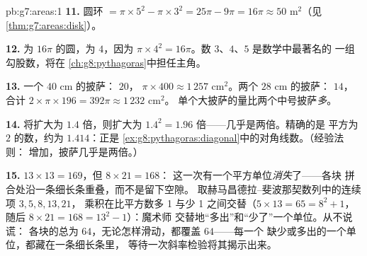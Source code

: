 \begin{solution}{pb:g7:areas:1}
\textbf{11.} 圆环 $= \pi \times 5^2 - \pi \times 3^2 = 25\pi -
9\pi = 16\pi \approx 50$ m$^2$（见\cref{thm:g7:areas:disk}）。

\textbf{12.} 为 $16\pi$ 的圆，为 $4$，因为
$\pi \times 4^2 = 16\pi$。数 $3$、$4$、$5$ 是数学中最著名的
一组勾股数，将在
\cref{ch:g8:pythagoras}中担任主角。

\textbf{13.} 一个 $40$ cm 的披萨： $20$，
 $\pi \times 400 \approx 1\,257$ cm$^2$。两个 $28$ cm
的披萨： $14$，合计
$2 \times \pi \times 196 = 392\pi \approx 1\,232$ cm$^2$。
单个大披萨的量比两个中号披萨\emph{多}。

\textbf{14.} 将扩大为 $1.4$ 倍，则扩大为
$1.4^2 = 1.96$ 倍——几乎是两倍。精确的是
平方为 $2$ 的数，约为 $1.414$：正是
\cref{ex:g8:pythagoras:diagonal}中的对角线数。（经验法则：
增加，披萨几乎是两倍。）

\textbf{15.} $13 \times 13 = 169$，但 $8 \times 21 = 168$：
这一次有一个平方单位\emph{消失}了——各块
拼合处沿一条细长条重叠，而不是留下空隙。
取赫马昌德拉–斐波那契数列中的连续项 $3, 5, 8, 13, 21$，
乘积在比平方数多 1
与少 1 之间交替（$5 \times 13 = 65 =
8^2 + 1$，随后 $8 \times 21 = 168 = 13^2 - 1$）：魔术师
交替地“多出”和“少了”一个单位。从不说谎：
各块的总为 $64$，无论怎样滑动，都覆盖 $64$——每一个
缺少或多出的一个单位，都藏在一条细长条里，
等待一次斜率检验将其揭示出来。
\end{solution}
